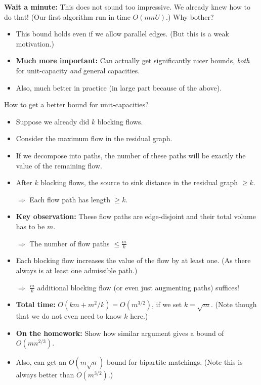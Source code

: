 \documentclass{article}
\begin{document}
{\bf Wait a minute:} This does not sound too impressive. We already knew how to do that! (Our first algorithm run in time $O(mnU)$.) Why bother?
\begin{itemize}
\item This bound holds even if we allow parallel edges. (But this is a weak motivation.)
\item \textbf{Much more important:} Can actually get significantly nicer bounds, {\em both} for unit-capacity {\em and} general capacities. 
\item Also, much better in practice (in large part because of the above).
\end{itemize}

How to get a better bound for unit-capacities?

\begin{itemize}
\item Suppose we already did $k$ blocking flows.
\item Consider the maximum flow in the residual graph.
\item If we decompose into paths, the number of these paths will be exactly the value of the remaining flow.
\item After $k$ blocking flows, the source to sink distance in the residual graph $\geq k$. 

$\Rightarrow$ Each flow path has length $\geq k$.
\item \textbf{Key observation:} These flow paths are edge-disjoint and their total volume has to be $m$.

$\Rightarrow$ The number of flow paths $\leq \frac{m}{k}$
\item Each blocking flow increases the value of the flow by at least one. (As there always is at least one admissible path.)

$\Rightarrow$ $\frac{m}{k}$ additional blocking flow (or even just augmenting paths) suffices!
\item \textbf{Total time:} $O(km+m^2/k)=O(m^{3/2})$, if we set $k=\sqrt{m}$. (Note though that we do not even need to know $k$ here.)
\item \textbf{On the homework:} Show how similar argument gives a bound of $O(mn^{2/3})$.

\item Also, can get an $O(m\sqrt{n})$ bound for bipartite matchings. (Note this is always better than $O(m^{3/2})$.)


\end{itemize}
\end{document}
